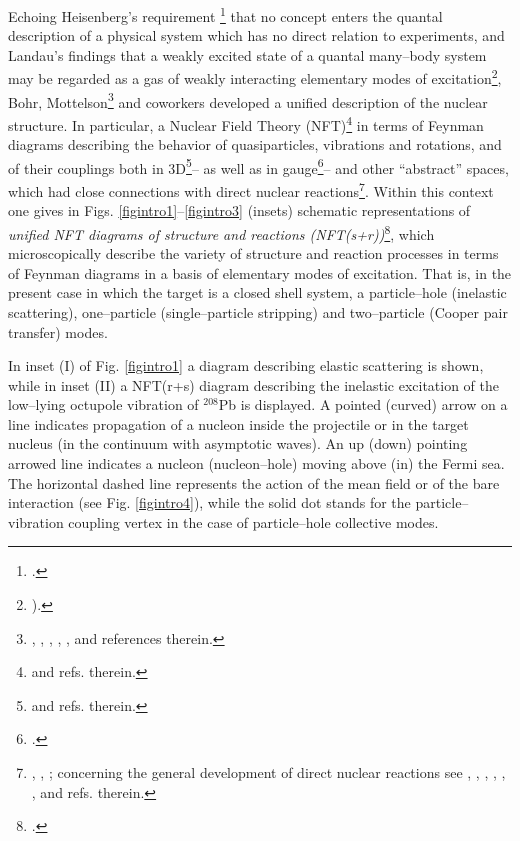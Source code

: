Echoing Heisenberg's requirement \footnote{\cite{Heisenberg:49}.} that no concept enters the quantal description of a physical system which has no direct relation to experiments, and Landau's findings that a weakly excited state of a quantal many--body system may be regarded as a gas of weakly interacting elementary modes of excitation\footnote{\cite{Landau:41}).}, Bohr, Mottelson\footnote{\cite{Bohr:64}, \cite{Bohr:69}, \cite{Bohr:76}, \cite{Mottelson:76}, \cite{Bohr:75}, \cite{Bohr:58} and references therein.} and coworkers developed a unified description of the nuclear  structure. In particular, a Nuclear Field Theory (NFT)\footnote{\cite{Bes:74,Broglia:76,Bes:90,Mottelson:76} and refs. therein.} in terms of Feynman diagrams describing the behavior of quasiparticles, vibrations and rotations, and of their couplings both in 3D\footnote{\cite{Nilsson:55,Bohr:75} and refs. therein.}-- as well as in gauge\footnote{\cite{Bohr:58,Belyaev:59,Bes:66,Bjerregaard:66b,Broglia:67,Bohr:75}.}-- and other ``abstract'' spaces, which had  close connections with direct nuclear reactions\footnote{ \cite{Alder:56}, \cite{Alder:75}, \cite{Broglia:04a}; concerning the general development of direct nuclear reactions see \cite{Austern:70}, \cite{Jackson:70}, \cite{Satchler:80}, \cite{Satchler:83}, \cite{Brink:85}, \cite{Glendenning:04,Thompson:09}, and refs. therein.}. Within this context one gives in Figs. \ref{figintro1}--\ref{figintro3} (insets)  schematic representations of  \textit{unified NFT diagrams of structure and reactions (NFT(s+r))}\footnote{\cite{Broglia:75,Broglia:04a,Potel:13,Broglia:16}.}, which microscopically describe the variety of structure and reaction processes in terms of Feynman diagrams in a basis of elementary modes of excitation. That is, in the present case in which the target is a closed shell system, a particle--hole (inelastic scattering), one--particle (single--particle stripping) and two--particle (Cooper pair transfer) modes. 

In inset (I) of Fig. \ref{figintro1} a diagram describing elastic scattering is shown, while in inset (II) a NFT(r+s) diagram describing the inelastic excitation of the low--lying octupole vibration of $^{208}$Pb is displayed. A pointed (curved) arrow on a line indicates propagation of a nucleon inside the projectile or in the target nucleus (in the continuum with asymptotic waves). An up (down) pointing arrowed line indicates a nucleon (nucleon--hole) moving above (in) the Fermi sea. The horizontal dashed line represents the action of the mean field or of the  bare interaction (see Fig. \ref{figintro4}), while the solid dot stands for the particle--vibration coupling vertex in the case of particle--hole collective modes. 


